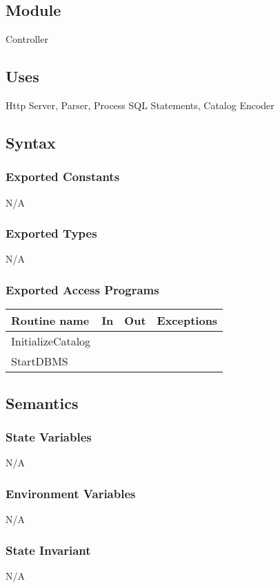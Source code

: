 \documentclass[12pt]{article}
\begin{document}
\subsection{Module}
Controller

\subsection {Uses}
Http Server, Parser, Process SQL Statements, Catalog Encoder

\subsection {Syntax}

\subsubsection {Exported Constants}
N/A
\subsubsection {Exported Types}
N/A
\subsubsection {Exported Access Programs}

\begin{tabular}{| l | l | l | l |}
\hline
\textbf{Routine name} & \textbf{In} & \textbf{Out} & \textbf{Exceptions}\\
\hline
InitializeCatalog & & & \\
StartDBMS & & & \\
\hline
\end{tabular}

\subsection {Semantics}

\subsubsection {State Variables}
N/A
\subsubsection {Environment Variables}
N/A
\subsubsection {State Invariant}
N/A
\end{document}
